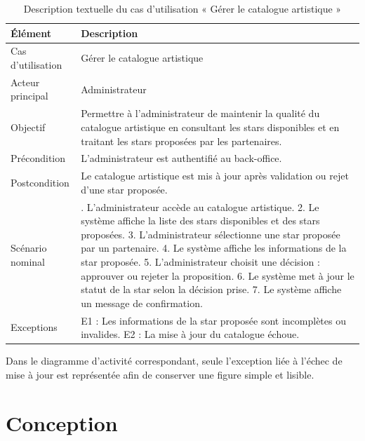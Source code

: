 \begin{table}[H]
\centering
\caption{Description textuelle du cas d’utilisation « Gérer le catalogue artistique »}
\label{tableau:5-6}
\renewcommand{\arraystretch}{1.2}
\begin{tabularx}{\textwidth}{|>{\raggedright\arraybackslash}X|>{\raggedright\arraybackslash}X|}
\hline
\rowcolor[HTML]{ECF4FF}
\textbf{Élément} & \textbf{Description} \\
\hline
Cas d’utilisation & Gérer le catalogue artistique \\
\hline
Acteur principal & Administrateur \\
\hline
Objectif & Permettre à l’administrateur de maintenir la qualité du catalogue artistique en consultant les stars disponibles et en traitant les stars proposées par les partenaires. \\
\hline
Précondition & L’administrateur est authentifié au back-office. \\
\hline
Postcondition & Le catalogue artistique est mis à jour après validation ou rejet d’une star proposée. \\
\hline
Scénario nominal & 1. L’administrateur accède au catalogue artistique.\newline{} 2. Le système affiche la liste des stars disponibles et des stars proposées.\newline{} 3. L’administrateur sélectionne une star proposée par un partenaire.\newline{} 4. Le système affiche les informations de la star proposée.\newline{} 5. L’administrateur choisit une décision : approuver ou rejeter la proposition.\newline{} 6. Le système met à jour le statut de la star selon la décision prise.\newline{} 7. Le système affiche un message de confirmation. \\
\hline
Exceptions & E1 : Les informations de la star proposée sont incomplètes ou invalides.\newline{} E2 : La mise à jour du catalogue échoue. \\
\hline
\end{tabularx}
\end{table}


Dans le diagramme d’activité correspondant, seule l’exception liée à l’échec de mise à jour est représentée afin de conserver une figure simple et lisible.


\section{Conception}


